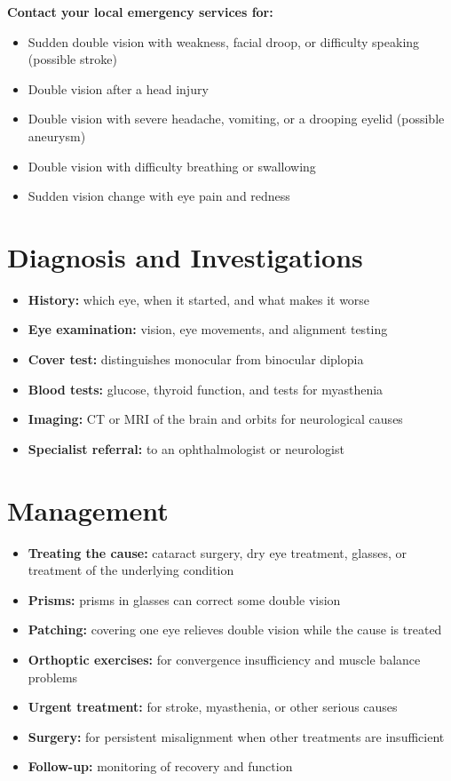 \textbf{Contact your local emergency services for:}
\begin{itemize}
    \item Sudden double vision with weakness, facial droop, or difficulty speaking (possible stroke)
    \item Double vision after a head injury
    \item Double vision with severe headache, vomiting, or a drooping eyelid (possible aneurysm)
    \item Double vision with difficulty breathing or swallowing
    \item Sudden vision change with eye pain and redness
\end{itemize}

\section*{Diagnosis and Investigations}
\begin{itemize}
    \item \textbf{History:} which eye, when it started, and what makes it worse
    \item \textbf{Eye examination:} vision, eye movements, and alignment testing
    \item \textbf{Cover test:} distinguishes monocular from binocular diplopia
    \item \textbf{Blood tests:} glucose, thyroid function, and tests for myasthenia
    \item \textbf{Imaging:} CT or MRI of the brain and orbits for neurological causes
    \item \textbf{Specialist referral:} to an ophthalmologist or neurologist
\end{itemize}

\section*{Management}
\begin{itemize}
    \item \textbf{Treating the cause:} cataract surgery, dry eye treatment, glasses, or treatment of the underlying condition
    \item \textbf{Prisms:} prisms in glasses can correct some double vision
    \item \textbf{Patching:} covering one eye relieves double vision while the cause is treated
    \item \textbf{Orthoptic exercises:} for convergence insufficiency and muscle balance problems
    \item \textbf{Urgent treatment:} for stroke, myasthenia, or other serious causes
    \item \textbf{Surgery:} for persistent misalignment when other treatments are insufficient
    \item \textbf{Follow-up:} monitoring of recovery and function
\end{itemize}

